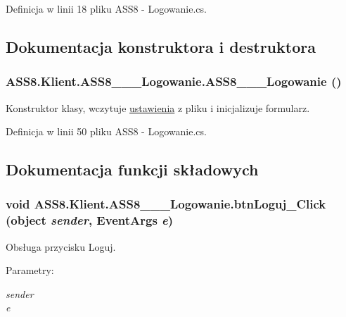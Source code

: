 Definicja w linii 18 pliku ASS8 - Logowanie.cs.

\subsection{Dokumentacja konstruktora i destruktora}
\hypertarget{a00001_d0767c13bd195aca9caa3e204ea140fe}{
\subsubsection[{ASS8\_\-\_\-\_\-Logowanie}]{\setlength{\rightskip}{0pt plus 5cm}ASS8.Klient.ASS8\_\-\_\-\_\-Logowanie.ASS8\_\-\_\-\_\-Logowanie ()}}
\label{d8/d84/a00001_d0767c13bd195aca9caa3e204ea140fe}


Konstruktor klasy, wczytuje \hyperlink{a00028}{ustawienia} z pliku i inicjalizuje formularz. 



Definicja w linii 50 pliku ASS8 - Logowanie.cs.

\subsection{Dokumentacja funkcji składowych}
\hypertarget{a00001_e4d9f543045422d0ca31e00f855c6651}{
\subsubsection[{btnLoguj\_\-Click}]{\setlength{\rightskip}{0pt plus 5cm}void ASS8.Klient.ASS8\_\-\_\-\_\-Logowanie.btnLoguj\_\-Click (object {\em sender}, \/  EventArgs {\em e})}}
\label{d8/d84/a00001_e4d9f543045422d0ca31e00f855c6651}


Obsługa przycisku Loguj. 

\begin{Desc}
\item[Parametry:]
\begin{description}
\item[{\em sender}]\item[{\em e}]\end{description}
\end{Desc}



